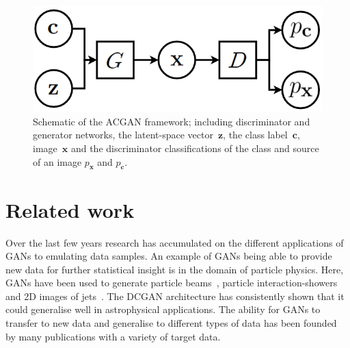 \documentclass[twocolumn]{article}
\numberwithin{equation}{section}
\begin{document}
\begin{figure}
\includegraphics[width=\columnwidth]{figures/diagrams/ACGAN_diagram.png}
\centering
\caption{Schematic of the ACGAN framework; including discriminator and generator networks, the latent-space 
         vector~$\mathbf{z}$, the class label~$\mathbf{c}$, image~$\mathbf{x}$ and the discriminator 
         classifications of the class and source of an image $p_{\mathbf{x}}$ and $p_\mathbf{c}$.}
\label{fig:GAN_diagram}
\end{figure}




\section{Related work}\label{sec:related_work}
Over the last few years research has accumulated on the different applications of GANs to emulating data samples. An 
example of GANs being able to provide new data for further statistical insight is in the domain of particle physics. Here, 
GANs have been used to generate particle beams~\cite{muon_beams_gan}, particle interaction-showers~\cite{particle_showers_gan} 
and 2D images of jets~\cite{particle_jets_gan}. The DCGAN architecture has consistently shown that it could generalise well 
in astrophysical applications. The ability for GANs to transfer to new data and generalise to different types of data has 
been founded by many publications with a variety of target data.
\end{document}
